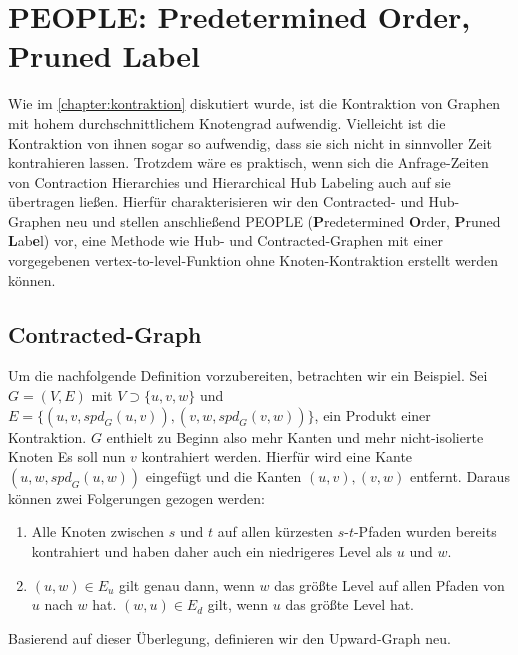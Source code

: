 \chapter{PEOPLE: Predetermined Order, Pruned Label}\label{chapter:peopel}

Wie im \autoref{chapter:kontraktion} diskutiert wurde, ist die Kontraktion von Graphen mit hohem durchschnittlichem Knotengrad aufwendig.
Vielleicht ist die Kontraktion von ihnen sogar so aufwendig, dass sie sich nicht in sinnvoller Zeit kontrahieren lassen.
Trotzdem wäre es praktisch, wenn sich die Anfrage-Zeiten von Contraction Hierarchies und Hierarchical Hub Labeling auch auf sie übertragen ließen.
Hierfür charakterisieren wir den Contracted- und Hub-Graphen neu und stellen anschließend PEOPLE (\textbf{P}redetermined \textbf{O}rder, \textbf{P}runed \textbf{L}ab\textbf{e}l) vor, eine Methode wie Hub- und Contracted-Graphen mit einer vorgegebenen vertex-to-level-Funktion ohne Knoten-Kontraktion erstellt werden können.

\section{Contracted-Graph}

Um die nachfolgende Definition vorzubereiten, betrachten wir ein Beispiel.
Sei $G = (V, E)$ mit $V \supset \{ u, v, w \}$ und $E = \{ (u, v, {spd}_G (u, v)), (v, w, {spd}_G (v, w)) \}$, ein Produkt einer Kontraktion.
$G$ enthielt zu Beginn also mehr Kanten und mehr nicht-isolierte Knoten
Es soll nun $v$ kontrahiert werden.
Hierfür wird eine Kante $(u, w, {spd}_G (u, w))$ eingefügt und die Kanten $(u, v), (v, w)$ entfernt.
Daraus können zwei Folgerungen gezogen werden:

\begin{enumerate}
  \item
        Alle Knoten zwischen $s$ und $t$ auf allen kürzesten $s$-$t$-Pfaden wurden bereits kontrahiert und haben daher auch ein niedrigeres Level als $u$ und $w$.

  \item
        $(u, w) \in E_u$ gilt genau dann, wenn $w$ das größte Level auf allen Pfaden von $u$ nach $w$ hat.
        $(w, u) \in E_d$ gilt, wenn $u$ das größte Level hat.
\end{enumerate}

Basierend auf dieser Überlegung, definieren wir den Upward-Graph neu.

